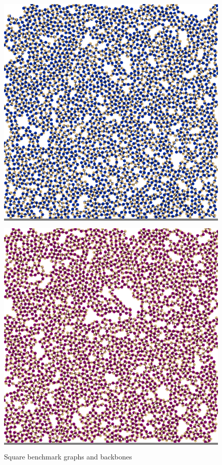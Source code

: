 \documentclass{article}
\begin{document}
\begin{figure}
\begin{minipage}{0.3\textwidth}
    \end{minipage}
    \hspace{\fill}
    \begin{minipage}{0.3\textwidth}
    \colorbox{gray}{\includegraphics[width=\linewidth]{./images/square_3_bb_0.png}}
    \end{minipage}
    \hspace{\fill}
    \begin{minipage}{0.3\textwidth}
    \colorbox{gray}{\includegraphics[width=\linewidth]{./images/square_3_bb_1.png}}
    \end{minipage}

    \caption{Square benchmark graphs and backbones}
    \label{squaresa}
\end{figure}
\end{document}
